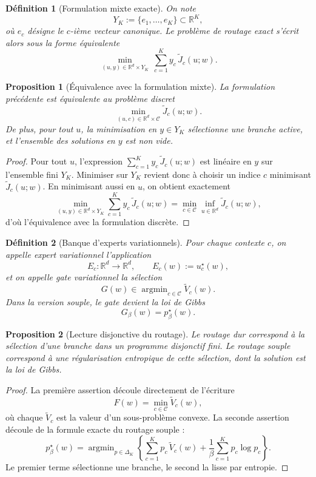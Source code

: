 \documentclass[11pt,a4paper]{article}
\newtheorem{definition}{Définition}[section]
\newtheorem{proposition}{Proposition}[section]
\DeclareMathOperator{\argmin}{argmin}
\newcommand{\R}{\mathbb R}
\newcommand{\Ccal}{\mathcal C}
\begin{document}
\begin{definition}[Formulation mixte exacte]
On note
\[
Y_K:=\{e_1,\dots,e_K\}\subset\R^K,
\]
où \(e_c\) désigne le \(c\)-ième vecteur canonique. Le problème de routage exact s'écrit alors sous la forme équivalente
\[
\min_{(u,y)\in\R^d\times Y_K}\ \sum_{c=1}^K y_c\,\widetilde J_c(u;w).
\]
\end{definition}

\begin{proposition}[Équivalence avec la formulation mixte]
La formulation précédente est équivalente au problème discret
\[
\min_{(u,c)\in\R^d\times\Ccal}\widetilde J_c(u;w).
\]
De plus, pour tout \(u\), la minimisation en \(y\in Y_K\) sélectionne une branche active, et l'ensemble des solutions en \(y\) est non vide.
\end{proposition}

\begin{proof}
Pour tout \(u\), l'expression \(\sum_{c=1}^K y_c\,\widetilde J_c(u;w)\) est linéaire en \(y\) sur l'ensemble fini \(Y_K\). Minimiser sur \(Y_K\) revient donc à choisir un indice \(c\) minimisant \(\widetilde J_c(u;w)\). En minimisant aussi en \(u\), on obtient exactement
\[
\min_{(u,y)\in\R^d\times Y_K}\sum_{c=1}^K y_c\,\widetilde J_c(u;w)
=
\min_{c\in\Ccal}\inf_{u\in\R^d}\widetilde J_c(u;w),
\]
d'où l'équivalence avec la formulation discrète.
\end{proof}

\begin{definition}[Banque d'experts variationnels]
Pour chaque contexte \(c\), on appelle expert variationnel l'application
\[
E_c:\R^d\to\R^d,\qquad E_c(w):=u_c^\star(w),
\]
et on appelle gate variationnel la sélection
\[
G(w)\in\argmin_{c\in\Ccal}\widetilde V_c(w).
\]
Dans la version souple, le gate devient la loi de Gibbs
\[
G_\beta(w)=p^\star_\beta(w).
\]
\end{definition}

\begin{proposition}[Lecture disjonctive du routage]
Le routage dur correspond à la sélection d'une branche dans un programme disjonctif fini. Le routage souple correspond à une régularisation entropique de cette sélection, dont la solution est la loi de Gibbs.
\end{proposition}

\begin{proof}
La première assertion découle directement de l'écriture
\[
F(w)=\min_{c\in\Ccal}\widetilde V_c(w),
\]
où chaque \(\widetilde V_c\) est la valeur d'un sous-problème convexe. La seconde assertion découle de la formule exacte du routage souple :
\[
p^\star_\beta(w)
=
\argmin_{p\in\Delta_K}
\left\{
\sum_{c=1}^K p_c\,\widetilde V_c(w)
+
\frac{1}{\beta}\sum_{c=1}^K p_c\log p_c
\right\}.
\]
Le premier terme sélectionne une branche, le second la lisse par entropie.
\end{proof}
\end{document}
